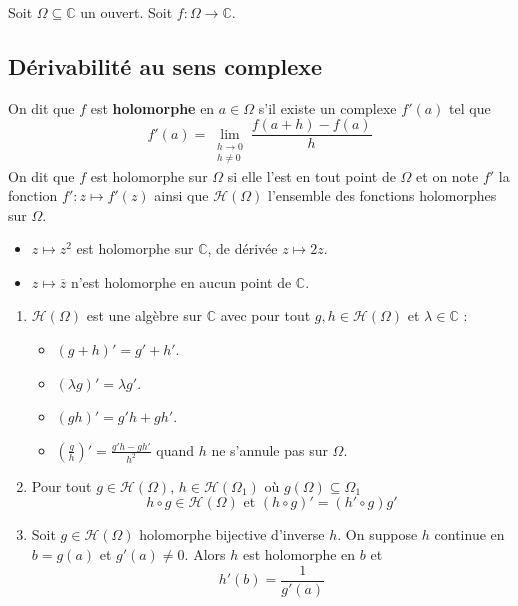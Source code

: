 




  Soit $\Omega \subseteq \mathbb{C}$ un ouvert. Soit $f : \Omega \rightarrow \mathbb{C}$.

  \subsection{Dérivabilité au sens complexe}


  \begin{definition}
    On dit que $f$ est \textbf{holomorphe} en $a \in \Omega$ s'il existe un complexe $f'(a)$ tel que
    \[ f'(a) = \lim_{\substack{h \rightarrow 0 \\ h \neq 0}} \frac{f(a+h) - f(a)}{h} \]
    On dit que $f$ est holomorphe sur $\Omega$ si elle l'est en tout point de $\Omega$ et on note $f'$ la fonction $f' : z \mapsto f'(z)$ ainsi que $\mathcal{H}(\Omega)$ l'ensemble des fonctions holomorphes sur $\Omega$.
  \end{definition}

  \begin{example}
    \begin{itemize}
      \item $z \mapsto z^2$ est holomorphe sur $\mathbb{C}$, de dérivée $z \mapsto 2z$.
      \item $z \mapsto \overline{z}$ n'est holomorphe en aucun point de $\mathbb{C}$.
    \end{itemize}
  \end{example}

  \begin{proposition}
    \begin{enumerate}[label={\bfseries(\roman*)}]
      \item $\mathcal{H}(\Omega)$ est une algèbre sur $\mathbb{C}$ avec pour tout $g, h \in \mathcal{H}(\Omega)$ et $\lambda \in \mathbb{C}$ :
      \begin{itemize}
        \item $(g+h)' = g'+h'$.
        \item $(\lambda g)' = \lambda g'$.
        \item $(gh)' = g'h + gh'$.
        \item $\left( \frac{g}{h} \right)' = \frac{g'h - gh'}{h^2}$ quand $h$ ne s'annule pas sur $\Omega$.
      \end{itemize}
      \item Pour tout $g \in \mathcal{H}(\Omega)$, $h \in \mathcal{H}(\Omega_1)$ où $g(\Omega) \subseteq \Omega_1$
      \[ h \circ g \in \mathcal{H}(\Omega) \text{ et } (h \circ g)' = (h' \circ g) g' \]
      \item Soit $g \in \mathcal{H}(\Omega)$ holomorphe bijective d'inverse $h$. On suppose $h$ continue en $b = g(a)$ et $g'(a) \neq 0$. Alors $h$ est holomorphe en $b$ et
      \[ h'(b) = \frac{1}{g'(a)} \]
    \end{enumerate}
  \end{proposition}

